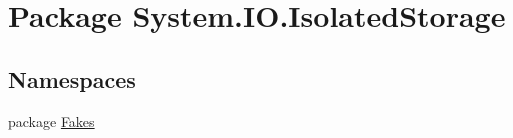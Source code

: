 \hypertarget{namespace_system_1_1_i_o_1_1_isolated_storage}{\section{Package System.\-I\-O.\-Isolated\-Storage}
\label{namespace_system_1_1_i_o_1_1_isolated_storage}
}
\subsection*{Namespaces}
\begin{DoxyCompactItemize}
\item 
package \hyperlink{namespace_system_1_1_i_o_1_1_isolated_storage_1_1_fakes}{Fakes}
\end{DoxyCompactItemize}
